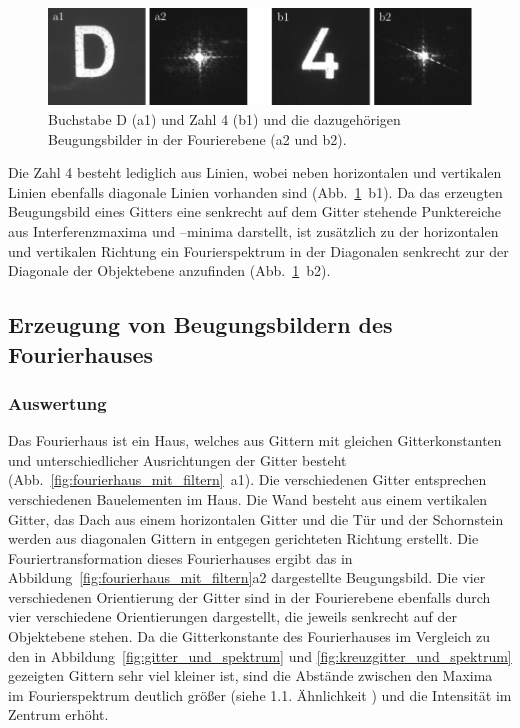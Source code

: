 \begin{figure}[h]
	\centering
	\includegraphics{images/Regina/abb19.pdf}
	\caption[Ziffern mit Fourierspektren]{
		Buchstabe D (a1) und Zahl 4 (b1) und die dazugehörigen Beugungsbilder in der Fourierebene (a2 und b2).
	}
	\label{fig:ziffern_mit_spektren}
\end{figure}

Die Zahl 4 besteht lediglich aus Linien, wobei neben horizontalen und vertikalen Linien ebenfalls diagonale Linien vorhanden sind (Abb.~\ref{fig:ziffern_mit_spektren}~b1). Da das erzeugten Beugungsbild eines Gitters eine senkrecht auf dem Gitter stehende Punktereiche aus Interferenzmaxima und –minima darstellt, ist zusätzlich zu der horizontalen und vertikalen Richtung ein Fourierspektrum in der Diagonalen senkrecht zur der Diagonale der Objektebene anzufinden (Abb.~\ref{fig:ziffern_mit_spektren}~b2).

\subsection{Erzeugung von Beugungsbildern des Fourierhauses}
\subsubsection*{Auswertung}

Das Fourierhaus ist ein Haus, welches aus Gittern mit gleichen Gitterkonstanten und unterschiedlicher Ausrichtungen der Gitter besteht (Abb.~\ref{fig:fourierhaus_mit_filtern}~a1). Die verschiedenen Gitter entsprechen verschiedenen Bauelementen im Haus. Die Wand besteht aus einem vertikalen Gitter, das Dach aus einem horizontalen Gitter und die Tür und der Schornstein werden aus diagonalen Gittern in entgegen gerichteten Richtung erstellt. Die Fouriertransformation dieses Fourierhauses ergibt das in Abbildung~\ref{fig:fourierhaus_mit_filtern}a2 dargestellte Beugungsbild. Die vier verschiedenen Orientierung der Gitter sind in der Fourierebene ebenfalls durch vier verschiedene Orientierungen dargestellt, die jeweils senkrecht auf der Objektebene stehen. Da die Gitterkonstante des Fourierhauses im Vergleich zu den in Abbildung~\ref{fig:gitter_und_spektrum} und \ref{fig:kreuzgitter_und_spektrum} gezeigten Gittern sehr viel kleiner ist, sind die Abstände zwischen den Maxima im Fourierspektrum deutlich größer (siehe 1.1. Ähnlichkeit%
 ) und die Intensität im Zentrum erhöht.


